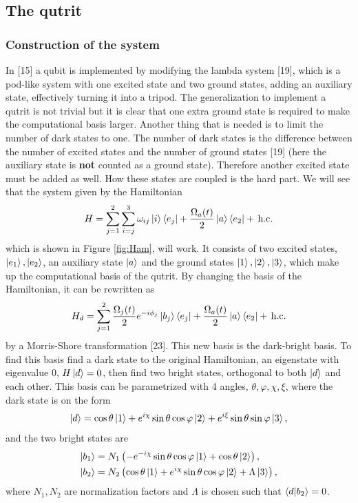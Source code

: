 \subsection{The qutrit}
\subsubsection{Construction of the system}
In [15] a qubit is implemented by modifying the lambda system [19], which is a pod-like system with one excited state and two ground states, adding an auxiliary state, effectively turning it into a tripod. The generalization to implement a qutrit is not trivial but it is clear that one extra ground state is required to make the computational basis larger. Another thing that is needed is to limit the number of dark states to one. The number of dark states is the difference between the number of excited states and the number of ground states [19] (here the auxiliary state is \textbf{not} counted as a ground state). Therefore another excited state must be added as well. How these states are coupled is the hard part. We will see that the system given by the Hamiltonian
\begin{equation}
\label{eq:Ham}
H = \sum_{j = 1}^2 \sum_{i =j}^{3} \omega_{ij}\ket{i}\bra{e_j}  + \frac{\Omega_{a}(t)}{2}\ket{a}\bra{e_2}  +\,\text{h.c.}
\end{equation}
which is shown in Figure \ref{fig:Ham}, will work.  It consists of two excited states, $\ket{e_1}, \ket{e_2}$, an auxiliary state $\ket{a}$ and the ground states $\ket{1}, \ket{2}, \ket{3}$, which 
make up the computational basis of the qutrit. By changing the basis of the Hamiltonian, it can be rewritten as 
\begin{equation}
\label{eq:Hamd}
H_d = \sum_{j = 1}^2 \frac{\Omega_j(t)}{2}e^{-i\phi_j}\ket{b_j}\bra{e_j}  + \frac{\Omega_a(t)}{2}\ket{a}\bra{e_2}  +\,\text{h.c.}
\end{equation} 
by a Morris-Shore transformation [23]. This new basis is the dark-bright basis. To find this basis find a dark state to the original  Hamiltonian, an eigenstate with eigenvalue $0$, $H\ket{d} = 0$, then find two bright states, orthogonal to both $\ket{d}$ and each other. This basis can be parametrized with 4 angles, $\theta, \varphi, \chi, \xi$, where the dark state is on the form 
\begin{equation}
\ket{d} = \cos\theta\ket{1} + e^{i\chi}\sin\theta\cos\varphi\ket{2} + e^{i\xi}\sin\theta\sin\varphi\ket{3},
\end{equation}
and the two bright states are 
\begin{equation}
\begin{aligned}
\ket{b_1} &= N_1 \left(-e^{-i\chi}\sin\theta\cos\varphi\ket{1} + \cos\theta\ket{2}\right),\\
\ket{b_2} &= N_2 \left(\cos\theta\ket{1} +  e^{i\chi}\sin\theta\cos\varphi\ket{2} + \Lambda \ket{3}\right),
\end{aligned}
\end{equation} where $N_1, N_2$ are normalization factors and $\Lambda$ is chosen such that $\bra{d}\ket{b_2} = 0$.

